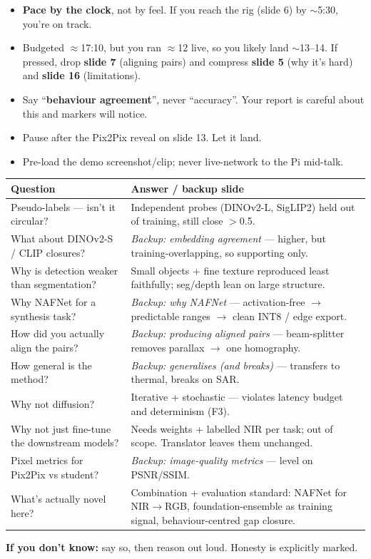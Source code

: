 \documentclass[11pt]{article}
\begin{document}
\hrulefill

\noindent{\bfseries\textcolor{ICLBlue}{Delivery reminders}}
\begin{itemize}
	\item \textbf{Pace by the clock}, not by feel. If you reach the rig (slide 6) by $\sim$5:30, you're on track.
	\item Budgeted $\approx$17:10, but you ran $\approx$12 live, so you likely land $\sim$13--14. If pressed, drop \textbf{slide 7} (aligning pairs) and compress \textbf{slide 5} (why it's hard) and \textbf{slide 16} (limitations).
	\item Say ``\textbf{behaviour agreement}'', never ``accuracy''. Your report is careful about this and markers will notice.
	\item Pause after the Pix2Pix reveal on slide 13. Let it land.
	\item Pre-load the demo screenshot/clip; never live-network to the Pi mid-talk.
\end{itemize}

\medskip
\noindent{\bfseries\textcolor{ICLBlue}{Q\&A --- likely questions $\to$ where to go}}

\smallskip
\renewcommand{\arraystretch}{1.25}
\noindent\begin{tabularx}{\textwidth}{@{}Y Y@{}}
\toprule
\textbf{Question} & \textbf{Answer / backup slide} \\
\midrule
Pseudo-labels --- isn't it circular? & Independent probes (DINOv2-L, SigLIP2) held out of training, still close $>$0.5. \\
What about DINOv2-S / CLIP closures? & \emph{Backup: embedding agreement} --- higher, but training-overlapping, so supporting only. \\
Why is detection weaker than segmentation? & Small objects + fine texture reproduced least faithfully; seg/depth lean on large structure. \\
Why NAFNet for a synthesis task? & \emph{Backup: why NAFNet} --- activation-free $\to$ predictable ranges $\to$ clean INT8 / edge export. \\
How did you actually align the pairs? & \emph{Backup: producing aligned pairs} --- beam-splitter removes parallax $\to$ one homography. \\
How general is the method? & \emph{Backup: generalises (and breaks)} --- transfers to thermal, breaks on SAR. \\
Why not diffusion? & Iterative + stochastic --- violates latency budget and determinism (F3). \\
Why not just fine-tune the downstream models? & Needs weights + labelled NIR per task; out of scope. Translator leaves them unchanged. \\
Pixel metrics for Pix2Pix vs student? & \emph{Backup: image-quality metrics} --- level on PSNR/SSIM. \\
What's actually novel here? & Combination + evaluation standard: NAFNet for NIR$\to$RGB, foundation-ensemble as training signal, behaviour-centred gap closure. \\
\bottomrule
\end{tabularx}

\medskip
\noindent\textbf{If you don't know:} say so, then reason out loud. Honesty is explicitly marked.
\end{document}
